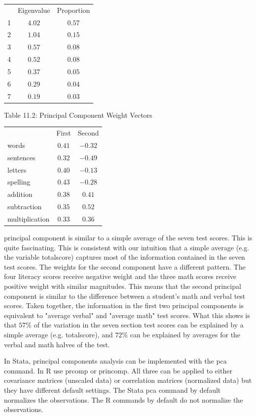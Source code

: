 \documentclass[10pt]{article}
\begin{document}
\begin{tabular}{lcc}
\hline\hline
 & Eigenvalue & Proportion \\
\cline { 2 - 3 }
1 & $4.02$ & $0.57$ \\
2 & $1.04$ & $0.15$ \\
3 & $0.57$ & $0.08$ \\
4 & $0.52$ & $0.08$ \\
5 & $0.37$ & $0.05$ \\
6 & $0.29$ & $0.04$ \\
7 & $0.19$ & $0.03$ \\
\hline
\end{tabular}

Table 11.2: Principal Component Weight Vectors

\begin{tabular}{lcc}
\hline\hline
 & First & Second \\
\cline { 2 - 3 }
words & $0.41$ & $-0.32$ \\
sentences & $0.32$ & $-0.49$ \\
letters & $0.40$ & $-0.13$ \\
spelling & $0.43$ & $-0.28$ \\
addition & $0.38$ & $0.41$ \\
subtraction & $0.35$ & $0.52$ \\
multiplication & $0.33$ & $0.36$ \\
\hline
\end{tabular}

principal component is similar to a simple average of the seven test scores. This is quite fascinating. This is consistent with our intuition that a simple average (e.g. the variable totalscore) captures most of the information contained in the seven test scores. The weights for the second component have a different pattern. The four literacy scores receive negative weight and the three math scores receive positive weight with similar magnitudes. This means that the second principal component is similar to the difference between a student's math and verbal test scores. Taken together, the information in the first two principal components is equivalent to "average verbal" and "average math" test scores. What this shows is that $57 \%$ of the variation in the seven section test scores can be explained by a simple average (e.g. totalscore), and $72 \%$ can be explained by averages for the verbal and math halves of the test.

In Stata, principal components analysis can be implemented with the pca command. In $\mathrm{R}$ use prcomp or princomp. All three can be applied to either covariance matrices (unscaled data) or correlation matrices (normalized data) but they have different default settings. The Stata pca command by default normalizes the observations. The R commands by default do not normalize the observations.
\end{document}
